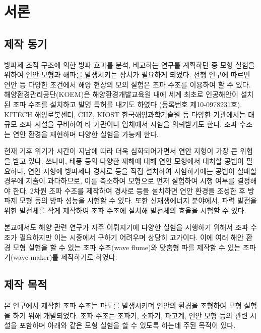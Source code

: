 \section{서론}


\subsection{제작 동기}

방파제 조적 구조에 의한 방파 효과를 분석, 비교하는 연구를 계획하던 중 모형 실험을 위하여 연안 모형과 해파를 발생시키는 장치가 필요하게 되었다. 선행 연구에 따르면 연안 등 다양한 조건에서 해양 현상의 모의 실험은 조파 수조를 이용하여 할 수 있다\cite{chung2013}. 해양환경관리공단(KOEM)은 해양환경개발교육원 내에 세계 최초로 인공해안이 설치된 조파 수조를 설치하고 발명 특허를 내기도 하였다 (등록번호 제10-0978231호). KITECH 해양로봇센터, CIIZ, KIOST 한국해양과학기술원 등 다양한 기관에서는 대규모 조파 시설을 구비하여 타 기관이나 업체에서 시험을 의뢰받기도 한다. 조파 수조는 연안 환경을 재현하며 다양한 실험을 가능케 한다.

현재 기후 위기가 시간이 지남에 따라 더욱 심화되어가면서 연안 지형이 가장 큰 위협을 받고 있다\cite{bini2021climate}. 쓰나미, 태풍 등의 다양한 재해에 대해 연안 모형에서 대처할 공법이 필요하나, 연안 지형에 방파제나 경사로 등을 직접 설치하여 시험하기에는 공법이 실패할 경우에 지출이 과다하므로, 이를 축소하여 모형으로 먼저 실험하여 시행 여부를 결정해야 한다. 2차원 조파 수조를 제작하여 경사로 등을 설치하면 연안 환경을 조성한 후 방파제 모형 등의 방파 성능을 시험할 수 있다. 또한 신재생에너지 분야에서, 파력 발전을 위한 발전체를 작게 제작하여 조파 수조에 설치해 발전체의 효율을 시험할 수 있다.

본교에서도 해양 관련 연구가 자주 이뤄지기에 다양한 실험을 시행하기 위해서 조파 수조가 필요하지만 이는 시중에서 구하기 어려우며 상당히 고가이다. 이에 여러 해안 환경 모형 실험을 할 수 있는 조파 수조(wave flume)와 맞춤형 파를 제작할 수 있는 조파기(wave maker)를 제작하기로 하였다. 


\subsection{제작 목적}

본 연구에서 제작한 조파 수조는 파도를 발생시키며 연안의 환경을 조형하여 모형 실험을 하기 위해 개발되었다. 조파 수조는 조파기, 소파기, 파고계, 연안 모형 등의 관련 시설을 포함하며 아래와 같은 모형 실험을 할 수 있도록 하는데 주된 목적이 있다.


